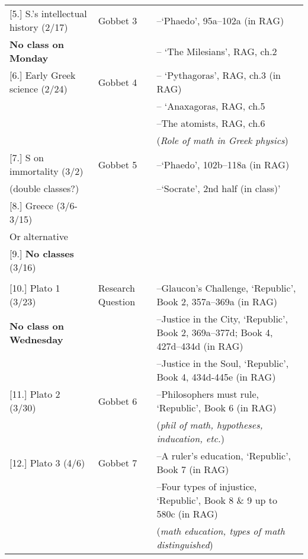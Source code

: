 \documentclass[article,oneside]{memoir}
\begin{document}
\begin{center}
\begin{longtable}{p{4.5cm}p{2cm}p{6cm}}
[5.] S.'s intellectual history (2/17) & Gobbet 3	 & --`Phaedo', 95a--102a  (in RAG)   \\
\textbf{No class on Monday}			& 				 & -- `The Milesians', RAG, ch.2 \\ [1.8\baselineskip]
  
[6.] Early Greek science (2/24)	  	& Gobbet 4		 & -- `Pythagoras', RAG, ch.3  (in RAG)   \\
									& 				 & -- `Anaxagoras, RAG, ch.5 \\ 
									& 				 & --The atomists, RAG, ch.6 \\
                                    &				 & (\emph{Role of math in Greek physics}) \\ [1.8\baselineskip]

[7.] S on immortality (3/2)	  		& Gobbet 5		 & --`Phaedo', 102b--118a  (in RAG)   \\
(double classes?)				& 				 & --`Socrate', 2nd half (in class)' \\ [1.8\baselineskip] 

[8.] Greece (3/6-3/15) 				& 				 &  					\\
Or alternative 					 	& 				 &   					\\ [1.8\baselineskip]	

[9.] \textbf{No classes} (3/16) 	& 				 &  					\\
					 				& 				 &   					\\ [1.8\baselineskip]	


[10.] Plato 1 (3/23)			 	& Research Question		& --Glaucon's Challenge, `Republic', Book 2, 357a--369a (in RAG)  \\
\textbf{No class on Wednesday}		& 	        			& --Justice in the City, `Republic', Book 2, 369a--377d; Book 4, 427d--434d (in RAG) \\  
				     			 	& 	        			& --Justice in the Soul, `Republic', Book 4, 434d-445e (in RAG) \\  [1.8\baselineskip]


[11.] Plato 2	(3/30)			& Gobbet 6		& --Philosophers must rule, `Republic', Book 6 (in RAG)\\
	            					&				& (\emph{phil of math, hypotheses, inducation, etc.})  \\  [1.8\baselineskip]

[12.] Plato 3	(4/6)				& Gobbet 7			& --A ruler's education, `Republic', Book 7 (in RAG)   \\
		            				&		   			& --Four types of injustice, `Republic', Book 8 \& 9 up to 580c (in RAG)\\  
                                  			  &					& (\emph{math education, types of math distinguished}) \\ [1.8\baselineskip]



\end{longtable}
\end{center}
\end{document}
